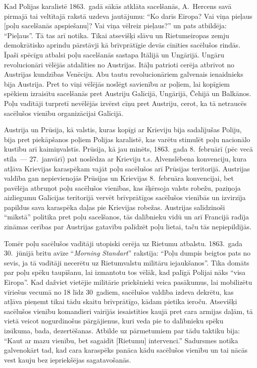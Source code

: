 \documentclass[twoside,a5paper,12pt,fleqn,openany]{extbook}
\newcommand{\entxti}[1]{\textit{\textenglish{#1}}}
\begin{document}
Kad Polijas karalistē 1863.~gadā sākās atklāta sacelšanās, A.~Hercens savā pirmajā tai veltītajā rakstā uzdeva jautājumu: ``Ko darīs Eiropa? Vai viņa pieļaus [poļu sacelšanās apspiešanu]? Vai viņa vēlreiz pieļaus?'' un pats atbildēja: ``Pieļaus''. Tā tas arī notika. Tikai atsevišķi slāvu un Rietumeiropas zemju demokrātisko aprindu pārstāvji kā brīvprātīgie devās cīnīties sacēlušos rindās. Īpaši spēcīgu atbalsi poļu sacelšanās sastapa Itālijā un Ungārijā. Ungāru revolucionāri vēlējās atdalīties no Austrijas. Itāļu patrioti cerēja atbrīvot no Austrijas kundzības Venēciju. Abu tautu revolucionāriem galvenais ienaidnieks bija Austrija. Pret to viņi vēlējās noslēgt savienību ar poļiem, lai kopīgiem spēkiem izraisītu sacelšanās pret Austriju Galīcijā, Ungārijā, Čehijā un Balkānos. Poļu vadītāji turpretī nevēlējās izvērst cīņu pret Austriju, cerot, ka tā netraucēs sacēlušos vienību organizācijai Galīcijā.

Austrija un Prūsija, kā valstis, kuras kopīgi ar Krieviju bija sadalījušas Poliju, bija pret piekāpšanos poļiem Polijas karalistē, kas varētu stimulēt poļu nacionālo kustību arī kaimiņvalstīs. Prūsija, kā jau minēts, 1863.~gada 8.~februārī (pēc vecā stila~--- 27.~janvārī) pat noslēdza ar Krieviju t.s. Alvenslēbena konvenciju, kura atļāva Krievijas karaspēkam vajāt poļu sacēlušos arī Prūsijas teritorijā. Austrijas valdība gan nepievienojās Prūsijas un Krievijas 8.~februāra konvencijai, bet pavēlēja atbruņot poļu sacēlušos vienības, kas šķērsoja valsts robežu, paziņoja aizliegumu Galīcijas teritorijā vervēt brīvprātīgos sacēlušos vienībās un izvirzīja papildus sava karaspēka daļas pie Krievijas robežas. Austrijas salīdzinoši ``mīkstā'' politika pret poļu sacelšanos, tās dalībnieku vidū un arī Francijā radīja zināmas cerības par Austrijas gatavību palīdzēt poļu lietai, taču tās nepiepildījās.

Tomēr poļu sacēlušos vadītāji utopiski cerēja uz Rietumu atbalstu. 1863.~gada 30.~jūnijā britu avīze ``\entxti{Morning Standart}'' rakstīja: ``Poļu dumpis beigtos pats no sevis, ja tā vadītāji necerētu uz Rietumvalstu militāru iejaukšanos''. Tika domāts par poļu spēku taupīšanu, lai izmantotu tos vēlāk, kad palīgā Polijai nāks ``visa Eiropa''. Kad dažviet vietējie militārie priekšnieki veica pasākumus, lai mobilizētu vīriešus vecumā no 18 līdz 30~gadiem, sacēlušos valdība izdeva dekrētu, kas atļāva pieņemt tikai tādu skaitu brīvprātīgo, kādam pietika ieroču. Atsevišķi sacēlušos vienību komandieri vairījās iesaistīties kaujā pret cara armijas daļām, tā vietā veicot nogurdinošus pārgājienus, kuri veda pie to dalībnieku spēku izsīkuma, bada, dezertēšanas. Atbilde uz pārmetumiem par tādu taktiku bija: ``Kaut ar mazu vienību, bet sagaidīt [Rietumu] intervenci.'' Sadursmes notika galvenokārt tad, kad cara karaspēks panāca kādu sacēlušos vienību un tai nācās vest kauju bez iepriekšējas sagatavošanās.
\end{document}
